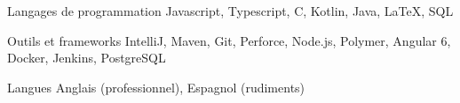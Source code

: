 
\begin{cvskills}

\cvskill
{Langages de programmation}
{Javascript, Typescript, C, Kotlin, Java, LaTeX, SQL}

\cvskill
{Outils et frameworks}
{IntelliJ, Maven, Git, Perforce, Node.js, Polymer, Angular 6, Docker, Jenkins, PostgreSQL}

\cvskill
{Langues}
{Anglais (professionnel), Espagnol (rudiments)}

\end{cvskills}
